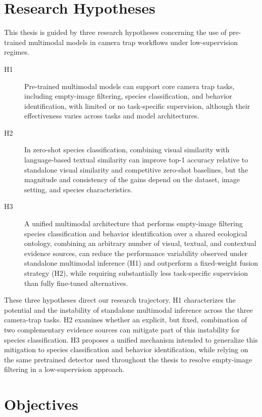 \section{Research Hypotheses}

This thesis is guided by three research hypotheses concerning the use of pre-trained multimodal models in camera trap workflows under low-supervision regimes.

\begin{description}
\item[H1] Pre-trained multimodal models can support core camera trap tasks, including empty-image filtering, species classification, and behavior identification, with limited or no task-specific supervision, although their effectiveness varies across tasks and model architectures.

\item[H2] In zero-shot species classification, combining visual similarity with language-based textual similarity can improve top-1 accuracy relative to standalone visual similarity and competitive zero-shot baselines, but the magnitude and consistency of the gains depend on the dataset, image setting, and species characteristics.

\item[H3] A unified multimodal architecture that performs empty-image filtering species classification and behavior identification over a shared ecological ontology, combining an arbitrary number of visual, textual, and contextual evidence sources, can reduce the performance variability observed under standalone multimodal inference (H1) and outperform a fixed-weight fusion strategy (H2), while requiring substantially less task-specific supervision than fully fine-tuned alternatives. 

\end{description}

These three hypotheses direct our research trajectory. H1 characterizes the potential and the instability of standalone multimodal inference across the three camera-trap tasks. H2 examines whether an explicit, but fixed, combination of two complementary evidence sources can mitigate part of this instability for species classification. H3 proposes a unified mechanism intended to generalize this mitigation to species classification and behavior identification, while relying on the same pretrained detector used throughout the thesis to resolve empty-image filtering in a low-supervision approach.

\section{Objectives}

